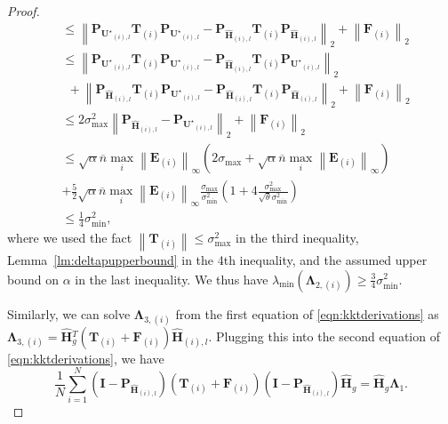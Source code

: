 \documentclass[twoside,11pt]{article}
\newcommand{\norm}[1]{\left\lVert#1\right\rVert}
\newcommand{\matE}{\mathbf{E}}
\newcommand{\matF}{\mathbf{F}}
\newcommand{\hmatH}{{\hat{\mathbf{H}}}{}}
\newcommand{\matI}{\mathbf{I}}
\newcommand{\matP}{\mathbf{P}}
\newcommand{\matT}{\mathbf{T}}
\newcommand{\matLambda}{\mathbf{\Lambda}}
\newcommand{\matUst}{{\mathbf{U}^\star}}
\newcommand{\gop}{\sigma_{\max}}
\newcommand{\bn}{{\overline{n}}}
\newcommand{\sabnb}{\sqrt{\alpha} \bn\max_{i}\norm{\matE_{(i)}}_{\infty}}
\newcommand{\sms}{\sigma_{\min}^2}
\begin{document}
\begin{proof}
\begin{align*}
&\le \norm{\matP_{\matUst_{(i),l}}\matT_{(i)}\matP_{\matUst_{(i),l}}-\matP_{\hmatH_{(i),l}}\matT_{(i)}\matP_{\hmatH_{(i),l}}}_2+\norm{\matF_{(i)}}_2\\
&\le \norm{\matP_{\matUst_{(i),l}}\matT_{(i)}\matP_{\matUst_{(i),l}}-\matP_{\hmatH_{(i),l}}\matT_{(i)}\matP_{\matUst_{(i),l}}}_2\\
&\ \ +\norm{\matP_{\hmatH_{(i),l}}\matT_{(i)}\matP_{\matUst_{(i),l}}-\matP_{\hmatH_{(i),l}}\matT_{(i)}\matP_{\hmatH_{(i),l}}}_2+\norm{\matF_{(i)}}_2\\
&\le 2\gop^2\norm{\matP_{\hmatH_{(i),l}}-\matP_{\matUst_{(i),l}}}_2 + \norm{\matF_{(i)}}_2\\
&\le \sabnb\left(2\gop+\sabnb\right)\\
&+\frac{5}{2}\sabnb\frac{\gop}{\sms}\left(1+4\frac{\gop^2}{\sqrt{\theta}\sms}\right) \\
&\le \frac{1}{4}\sms,
\end{align*}
where we used the fact $\norm{\matT_{(i)}}\le \gop^2$ in the third inequality, Lemma~\ref{lm:deltapupperbound} in the 4th inequality, and the assumed upper bound on $\alpha$ in the last inequality. We thus have $\lambda_{\min}\left(\matLambda_{2,(i)}\right)\ge \frac{3}{4}\sms$.

Similarly, we can solve $\matLambda_{3,(i)}$ from the first equation of \eqref{eqn:kktderivations} as $\matLambda_{3,(i)}=\hmatH_{g}^T\left(\matT_{(i)}+\matF_{(i)}\right)\hmatH_{(i),l}$. Plugging this into the second equation of \eqref{eqn:kktderivations}, we have
$$
\frac{1}{N}\sum_{i=1}^N\left(\matI-\matP_{\hmatH_{(i),l}}\right)\left(\matT_{(i)}+\matF_{(i)}\right)\left(\matI-\matP_{\hmatH_{(i),l}}\right)\hmatH_g=\hmatH_g\matLambda_1.
$$


\end{proof}
\end{document}
